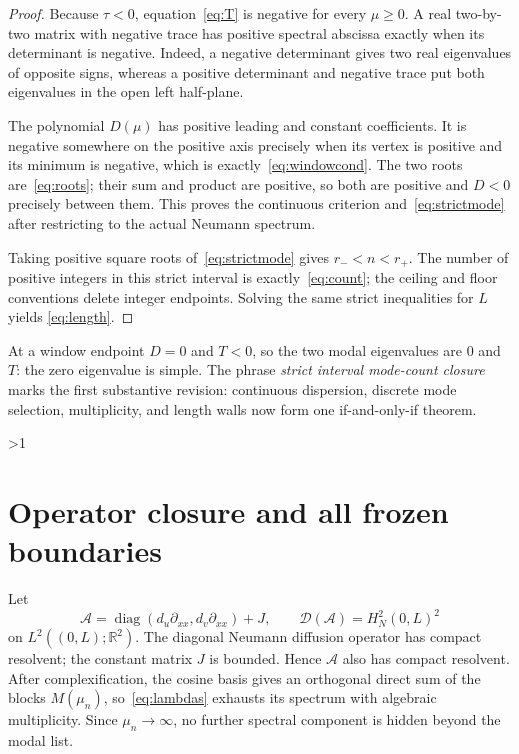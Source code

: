 \documentclass[10pt]{article}
\providecommand{\CRevisionRound}{2}
\newcommand{\R}{\mathbb R}
\begin{document}
\begin{proof}
Because $\tau<0$, equation~\eqref{eq:T} is negative for every $\mu\geq0$.
A real two-by-two matrix with negative trace has positive spectral abscissa
exactly when its determinant is negative.  Indeed, a negative determinant
gives two real eigenvalues of opposite signs, whereas a positive determinant
and negative trace put both eigenvalues in the open left half-plane.

The polynomial $D(\mu)$ has positive leading and constant coefficients.  It
is negative somewhere on the positive axis precisely when its vertex is
positive and its minimum is negative, which is exactly~\eqref{eq:windowcond}.
The two roots are~\eqref{eq:roots}; their sum and product are positive, so
both are positive and $D<0$ precisely between them.  This proves the
continuous criterion and~\eqref{eq:strictmode} after restricting to the
actual Neumann spectrum.

Taking positive square roots of~\eqref{eq:strictmode} gives
$r_-<n<r_+$.  The number of positive integers in this strict interval is
exactly~\eqref{eq:count}; the ceiling and floor conventions delete integer
endpoints.  Solving the same strict inequalities for $L$ yields
\eqref{eq:length}.
\end{proof}

At a window endpoint $D=0$ and $T<0$, so the two modal eigenvalues are
$0$ and $T$: the zero eigenvalue is simple.  The phrase
\emph{strict interval mode-count closure} marks the first substantive
revision: continuous dispersion, discrete mode selection, multiplicity, and
length walls now form one if-and-only-if theorem.
\fi

\ifnum\CRevisionRound>1
\section{Operator closure and all frozen boundaries}
Let
\begin{equation}\label{eq:A}
 \mathcal A=\operatorname{diag}(d_u\partial_{xx},d_v\partial_{xx})+J,
 \qquad \mathcal D(\mathcal A)=H_N^2(0,L)^2
\end{equation}
on $L^2((0,L);\R^2)$.  The diagonal Neumann diffusion operator has compact
resolvent; the constant matrix $J$ is bounded.  Hence $\mathcal A$ also has
compact resolvent.  After complexification, the cosine basis gives an
orthogonal direct sum of the blocks $M(\mu_n)$, so~\eqref{eq:lambdas}
exhausts its spectrum with algebraic multiplicity.  Since
$\mu_n\to\infty$, no further spectral component is hidden beyond the modal
list.
\end{document}
